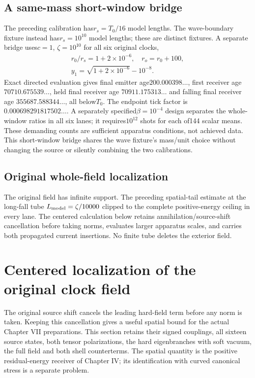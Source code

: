 \documentclass[10pt,twocolumn,letterpaper]{article}
\begin{document}
\subsection{A same-mass short-window bridge}
The preceding calibration has$r_s=T_0/16$ model lengths. The wave-boundary
fixture instead has$r_s=10^{10}$ model lengths; these are distinct fixtures.
A separate bridge uses$c=1$, $\zeta=10^{10}$ for all six original clocks,
\[
\begin{gathered}r_0/r_s=1+2\times10^{-6},\quad r_o=r_0+100,\\
 y_1=\sqrt{1+2\times10^{-6}}-10^{-8}.\end{gathered}
\]
Exact directed evaluation gives final emitter age$200.000398\ldots$,
first receiver age$70710.675539\ldots$, held final receiver age
$70911.175313\ldots$ and falling final receiver age
$355687.588344\ldots$, all below$T_0$. The endpoint tick factor is
$0.000698291817502\ldots$. A separately specified$\beta=10^{-4}$ design
separates the whole-window ratios in all six lanes; it requires$10^{12}$
shots for each of144 scalar means. These demanding counts are sufficient
apparatus conditions, not achieved data. This short-window bridge shares the
wave fixture's mass/unit choice without changing the source or silently
combining the two calibrations.

\subsection{Original whole-field localization}
The original field has infinite support. The preceding spatial-tail estimate at the long-fall tube $L_{\rm model}=\zeta/10000$ clipped to the complete positive-energy ceiling in every lane. The centered calculation below retains annihilation/source-shift cancellation before taking norms, evaluates larger apparatus scales, and carries both propagated current insertions. No finite tube deletes the exterior field.

\section{Centered localization of the original clock field}
\label{sec:centered-clock-localization}
The original source shift cancels the leading hard-field term before any
norm is taken.  Keeping this cancellation gives a useful spatial bound for
the actual Chapter VII preparations.  This section retains their signed
couplings, all sixteen source states, both tensor polarizations, the hard
eigenbranches with soft vacuum, the full field and both shell counterterms.
The spatial quantity is the positive residual-energy receiver of Chapter IV;
its identification with curved canonical stress is a separate problem.
\end{document}
